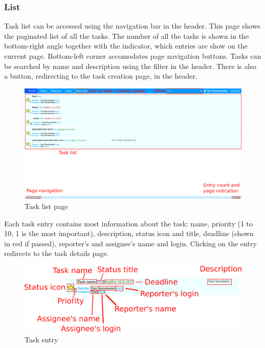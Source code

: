 \documentclass{article}
\begin{document}
\subsubsection{List}
Task list can be accessed using the navigation bar in the header. This page shows the paginated list of all the tasks. The number of all the tasks is shown in the bottom-right angle together with the indicator, which entries are show on the current page. Bottom-left corner accomodates page navigation buttons. Tasks can be searched by name and description using the filter in the header. There is also a button, redirecting to the task creation page, in the header.
\begin{figure}[H]
    \includegraphics[width=\textwidth]{img/tasks.png}
    \caption{Task list page}
\end{figure}
Each task entry contains most information about the task: name, priority (1 to 10, 1 is the most important), description, status icon and title, deadline (shown in red if passed), reporter's and assignee's name and login. Clicking on the entry redirects to the task details page.
\begin{figure}[H]
    \includegraphics[width=\textwidth]{img/task.png}
    \caption{Task entry}
\end{figure}
\end{document}
